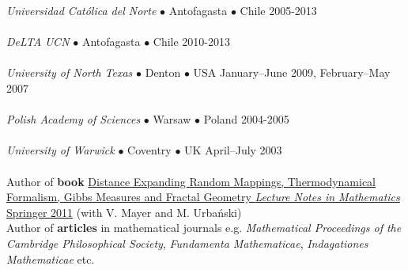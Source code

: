 \documentclass[a4paper, twoside]{scrreprt}
\begin{document}
{\noindent\makebox[\linewidth]{\rule{\textwidth}{0.4pt}}

\vspace{0.2cm}

\noindent{}\textit{Universidad Católica del Norte} $\bullet$ 
Antofagasta $\bullet$ Chile \hfill 2005-2013\\
\\
\noindent{}\textit{DeLTA UCN} $\bullet$ 
Antofagasta $\bullet$ Chile \hfill 2010-2013\\
\\
\noindent{}\textit{University of North Texas} $\bullet$ Denton $\bullet$ USA \hfill January--June 2009, February--May 2007\\
\\
\noindent{}\textit{Polish Academy of Sciences} $\bullet$ 
Warsaw $\bullet$ Poland \hfill 2004-2005\\
\\
\noindent{}\textit{University of Warwick} $\bullet$ Coventry $\bullet$ UK \hfill April--July 2003\\
\\
\noindent\llap{\FA \faBook\ \ }Author of \textbf{book} \href{http://www.amazon.com/Distance-Expanding-Thermodynamical-Formalism-Mathematics/dp/3642236499/ref=sr_1_1?s=books&ie=UTF8&qid=1410309067&sr=1-1}{Distance Expanding Random Mappings, Thermodynamical Formalism, Gibbs Measures and Fractal Geometry \textit{Lecture Notes in Mathematics} Springer 2011} (with V. Mayer and M. Urbański)\\
\noindent\llap{\FA \faPencil\ \ }Author of \textbf{articles} in 
mathematical journals e.g. 
\textit{Mathematical Proceedings of the Cambridge Philosophical Society}, \textit{Fundamenta Mathematicae}, \textit{Indagationes Mathematicae} etc.\\
}
\end{document}

